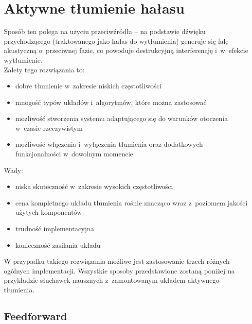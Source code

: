 \section{Aktywne tłumienie hałasu}
\label{sec:ANC}
Sposób ten polega na użyciu przeciwźródła -- na podstawie dźwięku przychodzącego (traktowanego jako hałas do wytłumienia) generuje się falę akustyczną o~przeciwnej fazie, co powoduje destrukcyjną interferencję i~w~efekcie wytłumienie.\\
Zalety tego rozwiązania to:
\begin{itemize}
	\item dobre tłumienie w~zakresie niskich częstotliwości
	\item mnogość typów układów i~algorytmów, które można zastosować
	\item możliwość stworzenia systemu adaptującego się do warunków otoczenia w~czasie rzeczywistym
	\item możliwość włączenia i~wyłączenia tłumienia oraz dodatkowych funkcjonalności w~dowolnym momencie
\end{itemize}
Wady:
\begin{itemize}
	\item niska skuteczność w~zakresie wysokich częstotliwości
	\item cena kompletnego układu tłumienia rośnie znacząco wraz z~poziomem jakości użytych komponentów
	\item trudność implementacyjna
	\item konieczność zasilania układu
\end{itemize}
W przypadku takiego rozwiązania możliwe jest zastosowanie trzech różnych ogólnych implementacji. Wszystkie sposoby przedstawione zostaną poniżej na przykładzie słuchawek nausznych z~zamontowanym układem aktywnego tłumienia.
\subsection{Feedforward}
\label{feedforward}

